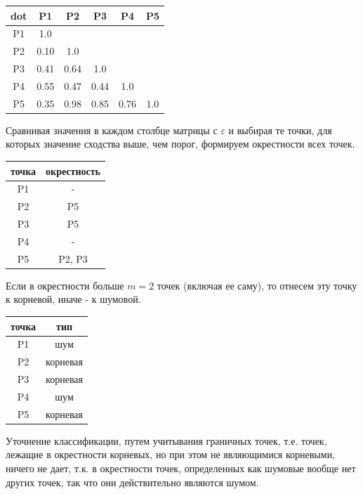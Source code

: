 \begin{center}
\begin{tabular}{ |c|c|c|c|c|c|} 
 \hline
dot & P1 & P2 & P3 & P4 & P5  \\ \hline
P1 & 1.0 &  &  &  &     \\ \hline
P2 & 0.10 & 1.0 &  &  &  \\ \hline
P3 & 0.41 & 0.64& 1.0 &  & \\ \hline
P4 & 0.55 & 0.47 & 0.44 & 1.0 & \\ \hline
P5 & 0.35 & 0.98 & 0.85 & 0.76 & 1.0 \\ \hline
\end{tabular}
\end{center}

Сравнивая значения в каждом столбце матрицы с $\varepsilon$ и выбирая те точки, для которых значение сходства выше, чем порог, формируем окрестности всех точек.

\begin{center}
\begin{tabular}{ |c|c| } 
 \hline
 точка & окрестность \\\hline
 P1 & -\\ 
 P2 & P5\\ 
 P3 & P5\\ 
 P4 & -\\
 P5 & P2, P3\\
 \hline
\end{tabular}
\end{center}

Если в окрестности больше $m=2$ точек (включая ее саму), то отнесем эту точку к корневой, иначе - к шумовой.

\begin{center}
\begin{tabular}{ |c|c| } 
 \hline
 точка & тип \\\hline
 P1 & шум\\ 
 P2 & корневая\\ 
 P3 & корневая\\ 
 P4 & шум\\
 P5 & корневая\\
 \hline
\end{tabular}
\end{center}

Уточнение классификации, путем учитывания граничных точек, т.е. точек, лежащие в окрестности корневых, но при этом не являющимися корневыми, ничего не дает, т.к. в окрестности точек, определенных как шумовые вообще нет других точек, так что они действительно являются шумом.

